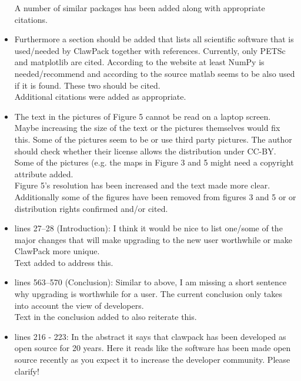 \documentclass{letter}
\begin{document}
\begin{letter}
\begin{itemize}
    A number of similar packages has been added along with appropriate
    citations. \\

    \item Furthermore a section should be added that lists all scientific
    software that is used/needed by ClawPack together with
    references. Currently, only PETSc and matplotlib are cited. According
    to the website at least NumPy is needed/recommend and according to the
    source matlab seems to be also used if it is found. These two should
    be cited. \\

    Additional citations were added as appropriate. \\

    \item The text in the pictures of Figure 5 cannot be read on a laptop
    screen. Maybe increasing the size of the text or the pictures
    themselves would fix this. Some of the pictures seem to be or use
    third party pictures. The author should check whether their license
    allows the distribution under CC-BY. Some of the pictures (e.g. the
    maps in Figure 3 and 5 might need a copyright attribute added. \\

    Figure 5's resolution has been increased and the text made more clear. 
    Additionally some of the figures have been removed from figures 3 and 5 or
    or distribution rights confirmed and/or cited. \\

    \item lines 27--28 (Introduction): I think it would be nice to list one/some
    of the major changes that will make upgrading to the new user worthwhile or
    make ClawPack more unique. \\

    Text added to address this. \\

    \item lines 563--570 (Conclusion): Similar to above, I am missing a short
    sentence why upgrading is worthwhile for a user. The current conclusion only
    takes into account the view of developers. \\

    Text in the conclusion added to also reiterate this. \\

    \item lines 216 - 223:  In the abstract it says that clawpack has been
    developed as open source for 20 years. Here it reads like the software has
    been made open source recently as you expect it to increase the developer
    community. Please clarify! \\


\end{itemize}
\end{letter}
\end{document}
